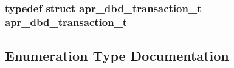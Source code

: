 \subsubsection[{\texorpdfstring{apr\+\_\+dbd\+\_\+transaction\+\_\+t}{apr_dbd_transaction_t}}]{\setlength{\rightskip}{0pt plus 5cm}typedef struct {\bf apr\+\_\+dbd\+\_\+transaction\+\_\+t} {\bf apr\+\_\+dbd\+\_\+transaction\+\_\+t}}\hypertarget{group__APR__Util__DBD_ga92eb10d7ec8fdb3a39a7d6fdfffdf8fb}{}\label{group__APR__Util__DBD_ga92eb10d7ec8fdb3a39a7d6fdfffdf8fb}


\subsection{Enumeration Type Documentation}
